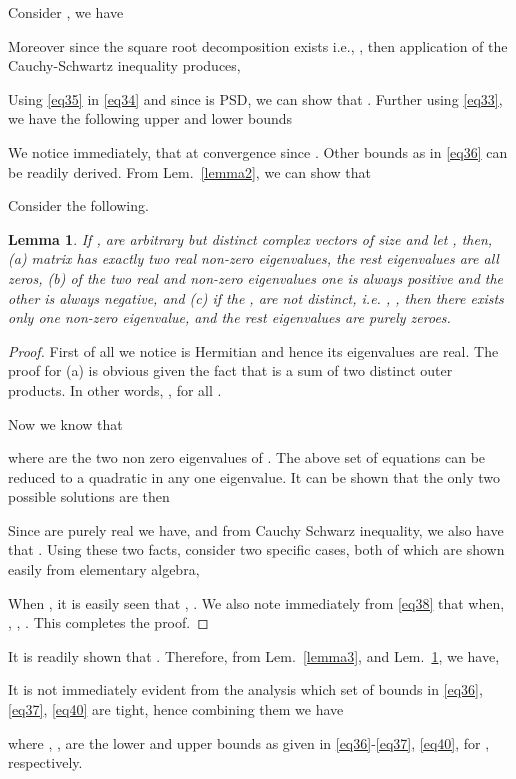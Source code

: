 \documentclass[11pt,draftclsnofoot,onecolumn]{IEEEtran}
\newtheorem{lem}{\bf {Lemma}}
\theoremstyle{definition}
\theoremstyle{remark}
\begin{document}
Consider , we have

Moreover since the square root decomposition exists i.e., , then application of the Cauchy-Schwartz inequality produces,

Using \eqref{eq35} in \eqref{eq34} and since  is PSD, we can show that 
. Further using \eqref{eq33}, we have the following upper and lower bounds

We notice immediately, that at convergence  since . Other bounds as in \eqref{eq36} can be readily derived. From Lem.~\ref{lemma2}, we can show that


Consider the following.
\begin{lem} \label{lemma4}
If ,  are arbitrary but distinct complex vectors of size  and let , then,
(a)  matrix  has exactly two real non-zero eigenvalues, the rest  eigenvalues are all zeros,
(b) of the two real and non-zero eigenvalues one is always positive and the other is always negative, and 
(c) if the ,  are not distinct, i.e. , , then there exists only one non-zero eigenvalue, and  the rest  eigenvalues are purely zeroes.
\end{lem}
\begin{proof}
First of all we notice  is Hermitian and hence its eigenvalues are real. The proof for (a) is obvious given the fact that  is a sum of two distinct outer products. In other words, , for all  .

Now we know that

where  are the two non zero eigenvalues of . The above  set of equations can be reduced to  a quadratic in any one eigenvalue. It can be shown that the only two possible solutions are then 

Since  are purely real we have,  and from Cauchy Schwarz inequality, we also have that . Using these two facts, consider two specific cases, both of which are shown easily from elementary algebra, 

When , it is easily seen that , . We also note immediately from \eqref{eq38} that when, , , . This completes the proof.
\end{proof}

It is readily shown that . Therefore, from Lem.~\ref{lemma3}, and Lem.~\ref{lemma4}, we have,

It is not  immediately evident from the analysis which set of bounds in \eqref{eq36}, \eqref{eq37}, \eqref{eq40} are tight, hence combining them we have

 where , ,  are the lower and upper bounds as given in \eqref{eq36}-\eqref{eq37}, \eqref{eq40}, for , respectively.
 
\end{document}
